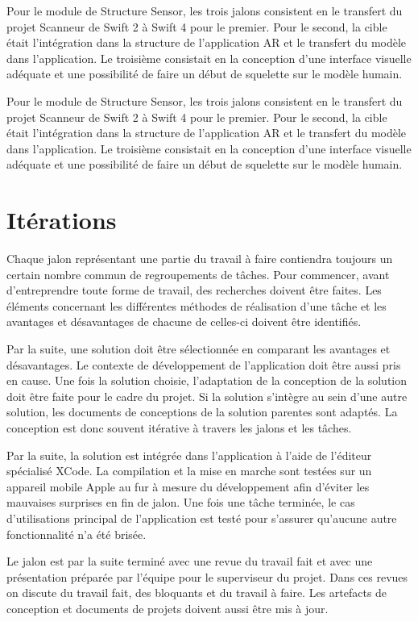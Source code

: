 \documentclass[rapport.tex]{subfiles}
\begin{document}
\par
Pour le module de Structure Sensor, les trois jalons consistent en le transfert du projet Scanneur de Swift 2 à Swift 4 pour le premier. Pour le second, la cible était l’intégration dans la structure de l’application AR et le transfert du modèle dans l’application. Le troisième consistait en la conception d’une interface visuelle adéquate et une possibilité de faire un début de squelette sur le modèle humain.
\par
Pour le module de Structure Sensor, les trois jalons consistent en le transfert du projet Scanneur de Swift 2 à Swift 4 pour le premier. Pour le second, la cible était l’intégration dans la structure de l’application AR et le transfert du modèle dans l’application. Le troisième consistait en la conception d’une interface visuelle adéquate et une possibilité de faire un début de squelette sur le modèle humain.
\section*{Itérations}
Chaque jalon représentant une partie du travail à faire contiendra toujours un certain nombre commun de regroupements de tâches. Pour commencer, avant d’entreprendre toute forme de travail, des recherches doivent être faites. Les éléments concernant les différentes méthodes de réalisation d’une tâche et les avantages et désavantages de chacune de celles-ci doivent être identifiés.
\par
Par la suite, une solution doit être sélectionnée en comparant les avantages et désavantages. Le contexte de développement de l’application doit être aussi pris en cause. Une fois la solution choisie, l’adaptation de la conception de la solution doit être faite pour le cadre du projet. Si la solution s’intègre au sein d’une autre solution, les documents de conceptions de la solution parentes sont adaptés. La conception est donc souvent itérative à travers les jalons et les tâches.
\par
Par la suite, la solution est intégrée dans l’application à l’aide de l’éditeur spécialisé XCode. La compilation et la mise en marche sont testées sur un appareil mobile Apple au fur à mesure du développement afin d’éviter les mauvaises surprises en fin de jalon. Une fois une tâche terminée, le cas d’utilisations principal de l’application est testé pour s’assurer qu’aucune autre fonctionnalité n’a été brisée.
\par
Le jalon est par la suite terminé avec une revue du travail fait et avec une présentation préparée par l’équipe pour le superviseur du projet. Dans ces revues on discute du travail fait, des bloquants et du travail à faire. Les artefacts de conception et documents de projets doivent aussi être mis à jour.
\end{document}
